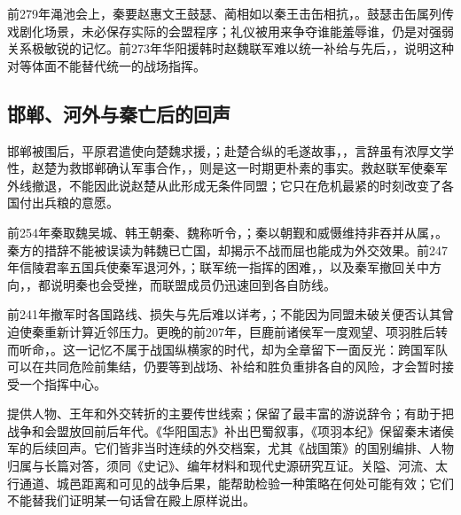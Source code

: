 前279年渑池会上，秦要赵惠文王鼓瑟、蔺相如以秦王击缶相抗，。鼓瑟击缶属列传戏剧化场景，未必保存实际的会盟程序；礼仪被用来争夺谁能羞辱谁，仍是对强弱关系极敏锐的记忆。前273年华阳援韩时赵魏联军难以统一补给与先后，，说明这种对等体面不能替代统一的战场指挥。

\subsection{邯郸、河外与秦亡后的回声}

邯郸被围后，平原君遣使向楚魏求援，；赴楚合纵的毛遂故事，，言辞虽有浓厚文学性，赵楚为救邯郸确认军事合作，，则是这一时期更朴素的事实。救赵联军使秦军外线撤退，不能因此说赵楚从此形成无条件同盟；它只在危机最紧的时刻改变了各国付出兵粮的意愿。

前254年秦取魏吴城、韩王朝秦、魏称听令，；秦以朝觐和威慑维持非吞并从属，。秦方的措辞不能被误读为韩魏已亡国，却揭示不战而屈也能成为外交效果。前247年信陵君率五国兵使秦军退河外，；联军统一指挥的困难，，以及秦军撤回关中方向，，都说明秦也会受挫，而联盟成员仍迅速回到各自防线。

前241年撤军时各国路线、损失与先后难以详考，；不能因为同盟未破关便否认其曾迫使秦重新计算近邻压力。更晚的前207年，巨鹿前诸侯军一度观望、项羽胜后转而听命，。这一记忆不属于战国纵横家的时代，却为全章留下一面反光：跨国军队可以在共同危险前集结，仍要等到战场、补给和胜负重排各自的风险，才会暂时接受一个指挥中心。

\begin{sourcenote}[把说辞放回它的文本和地面]
提供人物、王年和外交转折的主要传世线索；保留了最丰富的游说辞令；有助于把战争和会盟放回前后年代。《华阳国志》补出巴蜀叙事，《项羽本纪》保留秦末诸侯军的后续回声。它们皆非当时连续的外交档案，尤其《战国策》的国别编排、人物归属与长篇对答，须同《史记》、编年材料和现代史源研究互证。关隘、河流、太行通道、城邑距离和可见的战争后果，能帮助检验一种策略在何处可能有效；它们不能替我们证明某一句话曾在殿上原样说出。
\end{sourcenote}

